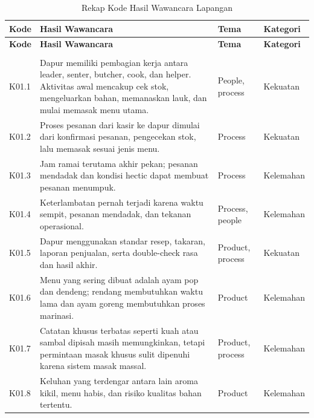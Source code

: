 \begingroup
\tiny
\begin{xltabular}{\textwidth}{|C{1.0cm}|Y|L{2.6cm}|L{2.0cm}|}
\caption{Rekap Kode Hasil Wawancara Lapangan}
\label{tab:rekap-kode-temuan-wawancara-lapangan}
\label{tab:rekap-kode-hasil-wawancara-lapangan} \\
\toprule
\textbf{Kode} & \textbf{Hasil Wawancara} & \textbf{Tema} & \textbf{Kategori} \\ \hline
\midrule
\endfirsthead

\toprule
\textbf{Kode} & \textbf{Hasil Wawancara} & \textbf{Tema} & \textbf{Kategori} \\ \hline
\midrule
\endhead

\endfoot

\bottomrule
\endlastfoot
{} \\ \hline
K01.1 & Dapur memiliki pembagian kerja antara leader, senter, butcher, cook, dan helper. Aktivitas awal mencakup cek stok, mengeluarkan bahan, memanaskan lauk, dan mulai memasak menu utama. & People, process & Kekuatan \\ \hline
K01.2 & Proses pesanan dari kasir ke dapur dimulai dari konfirmasi pesanan, pengecekan stok, lalu memasak sesuai jenis menu. & Process & Kekuatan \\ \hline
K01.3 & Jam ramai terutama akhir pekan; pesanan mendadak dan kondisi hectic dapat membuat pesanan menumpuk. & Process & Kelemahan \\ \hline
K01.4 & Keterlambatan pernah terjadi karena waktu sempit, pesanan mendadak, dan tekanan operasional. & Process, people & Kelemahan \\ \hline
K01.5 & Dapur menggunakan standar resep, takaran, laporan penjualan, serta double-check rasa dan hasil akhir. & Product, process & Kekuatan \\ \hline
K01.6 & Menu yang sering dibuat adalah ayam pop dan dendeng; rendang membutuhkan waktu lama dan ayam goreng membutuhkan proses marinasi. & Product & Kelemahan \\ \hline
K01.7 & Catatan khusus terbatas seperti kuah atau sambal dipisah masih memungkinkan, tetapi permintaan masak khusus sulit dipenuhi karena sistem masak massal. & Product, process & Kelemahan \\ \hline
K01.8 & Keluhan yang terdengar antara lain aroma kikil, menu habis, dan risiko kualitas bahan tertentu. & Product & Kelemahan \\ \hline

\end{xltabular}
